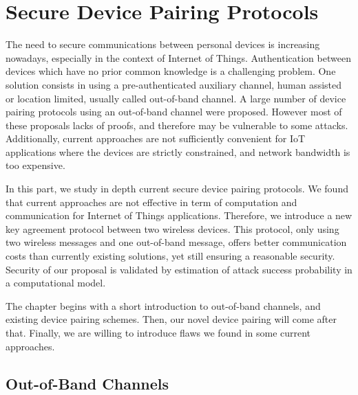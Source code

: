 
\chapter{Secure Device Pairing Protocols} %

\label{Chapter2} %



The need to secure communications between personal devices is increasing nowadays, especially in the context of Internet of Things. Authentication between devices which have no prior common knowledge is a challenging problem. One solution consists in using a pre-authenticated auxiliary channel, human assisted or location limited, usually called out-of-band channel. A large number of device pairing protocols using an out-of-band channel were proposed. However most of these proposals lacks of proofs, and therefore may be vulnerable to some attacks. Additionally, current approaches are not sufficiently convenient for IoT applications where the devices are strictly constrained, and network bandwidth is too expensive. 

In this part, we study in depth current secure device pairing protocols. We found that current approaches are not effective in term of computation and communication for Internet of Things applications. Therefore, we introduce a new key agreement protocol between two wireless devices. This protocol, only using two wireless messages and one out-of-band message, offers better communication costs than currently existing solutions, yet still ensuring a reasonable security. Security of our proposal is validated by estimation of attack success probability in a computational model.  

The chapter begins with a short introduction to out-of-band channels, and existing device pairing schemes. Then, our novel device pairing will come after that.  Finally, we are willing to introduce flaws we found in some current approaches. 

\section{Out-of-Band Channels}

